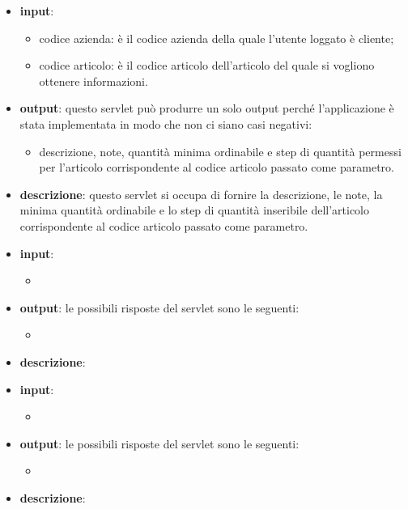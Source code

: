 
\begin{itemize}
	\item \textbf{input}:
		\begin{itemize}
			\item codice azienda: è il codice azienda della quale l'utente loggato è cliente;
			\item codice articolo: è il codice articolo dell'articolo del quale si vogliono ottenere informazioni.
		\end{itemize}
	\item \textbf{output}: questo servlet può produrre un solo output perché l'applicazione è stata implementata in modo che non ci siano casi negativi:
		\begin{itemize}
			\item descrizione, note, quantità minima ordinabile e step di quantità permessi per l'articolo corrispondente al codice articolo passato come parametro.
		\end{itemize}
	\item \textbf{descrizione}: questo servlet si occupa di fornire la descrizione, le note, la minima quantità ordinabile e lo step di quantità inseribile dell'articolo corrispondente al codice articolo passato come parametro. 
\end{itemize}


\begin{itemize}
	\item \textbf{input}:
		\begin{itemize}
			\item
		\end{itemize}
	\item \textbf{output}: le possibili risposte del servlet sono le seguenti:
		\begin{itemize}
			\item
		\end{itemize}
	\item \textbf{descrizione}:
\end{itemize}


\begin{itemize}
	\item \textbf{input}:
		\begin{itemize}
			\item
		\end{itemize}
	\item \textbf{output}: le possibili risposte del servlet sono le seguenti:
		\begin{itemize}
			\item
		\end{itemize}
	\item \textbf{descrizione}:
\end{itemize}

